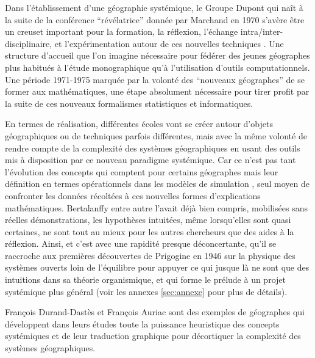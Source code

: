 
Dans l'établissement d'une géographie systémique, le Groupe Dupont qui naît à la suite de la conférence \enquote{révélatrice} donnée par Marchand en 1970 s'avère être un creuset important pour la formation, la réflexion, l'échange intra/inter-disciplinaire, et l'expérimentation autour de ces nouvelles techniques \autocites[2]{LeBerre1987}[125-128]{Pumain2002}. Une structure d'accueil que l'on imagine nécessaire pour fédérer des jeunes géographes plus habitués à l'étude monographique qu'à l'utilisation d'outils computationnels. Une période 1971-1975 marquée par la volonté des \enquote{nouveaux géographes} de se former aux mathématiques, une étape absolument nécessaire pour tirer profit par la suite de ces nouveaux formalismes statistiques et informatiques. 


En termes de réalisation, différentes écoles vont se créer autour d'objets géographiques ou de techniques parfois différentes, mais avec la même volonté de rendre compte de la complexité des systèmes géographiques en usant des outils mis à disposition par ce nouveau paradigme systémique. Car ce n'est pas tant l'évolution des concepts qui comptent pour certains géographes mais leur définition en termes opérationnels dans les modèles de simulation \autocite{Pumain2003}, seul moyen de confronter les données récoltées à ces nouvelles formes d'explications mathématiques. Bertalanffy entre autre l'avait déjà bien compris, mobilisées sans réelles démonstrations, les hypothèses intuitées, même lorsqu'elles sont quasi certaines, ne sont tout au mieux pour les autres chercheurs que des aides à la réflexion. Ainsi, et c'est avec une rapidité presque déconcertante, qu'il se raccroche aux premières découvertes de Prigogine en 1946 sur la physique des systèmes ouverts loin de l'équilibre pour appuyer ce qui jusque là ne sont que des intuitions dans sa théorie organismique, et qui forme le prélude à un projet systémique plus général (voir les annexes \ref{sec:annexe} pour plus de détails).

François Durand-Dastès et François Auriac sont des exemples de géographes qui développent dans leurs études toute la puissance heuristique des concepts systémiques et de leur traduction graphique pour décortiquer la complexité des systèmes géographiques.

